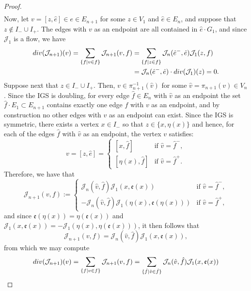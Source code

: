 \documentclass[10pt,a4paper]{amsart}
\newcommand{\cJ}{\mathcal{J}}
\newcommand{\divr}{{\rm div}}
\begin{document}
\begin{proof}
\[\begin{split}
        \end{split}
        \]
    Now, let \(v=[z,\hat{e}]\in e\in E_{n+1}\) for some \(z\in V_1\) and \(\hat{e}\in E_n\), and suppose that \(z\not\in I_-\cup I_+\). The edges with \(v\) as an endpoint are all contained in \(\hat{e}\cdot G_1\), and since \(\cJ_1\) is a flow, we have
        \[
        \begin{split}
            \divr(\cJ_{n+1})(v)=\sum_{\{f\mid v\in f\}}\cJ_{n+1}(v,f)&=\sum_{\{f\mid z\in f\}}\cJ_n(\hat{e}^-,\hat{e})\cJ_1(z,f)\\
            &=\cJ_n(\hat{e}^-,\hat{e})\cdot\divr(\cJ_1)(z) =0.
        \end{split}
        \]
    Suppose next that \(z\in I_-\cup I_+\). Then, \(v\in\pi_{n+1}^{-1}(\hat{v})\) for some \(\hat{v}=\pi_{n+1}(v)\in V_n\). Since the IGS is doubling, for every edge \(\hat{f}\in E_n\) with \(\hat{v}\) as an endpoint the set \(\hat{f}\cdot E_1\subset E_{n+1}\) contains exactly one edge \(f\) with \(v\) as an endpoint, and by construction no other edges with \(v\) as an endpoint can exist. Since the IGS is symmetric, there exists a vertex \(x\in I_-\) so that \(z\in\{x,\eta(x)\}\) and hence, for each of the edges \(\hat{f}\) with \(\hat{v}\) as an endpoint, the vertex \(v\) satisfies:
    \[
        v=[z,\hat{e}]=
        \begin{cases}
            [x,\hat{f}]&\text{if }\hat{v}=\hat{f}^-,\\
            [\eta(x),\hat{f}]&\text{if }\hat{v}=\hat{f}^+.
        \end{cases}
    \]
    Therefore, we have that
    \[
        \cJ_{n+1}(v,f):=
        \begin{cases}
            \cJ_n(\hat{v},\hat{f})\cJ_1(x,\mathfrak{e}(x))  &\text{if }\hat{v}=\hat{f}^-,\\
            -\cJ_n(\hat{v},\hat{f})\cJ_1(\eta(x),\mathfrak{e}(\eta(x))) &\text{if }\hat{v}=\hat{f}^+,
        \end{cases}
    \]
    and since \(\mathfrak{e}(\eta(x))=\eta(\mathfrak{e}(x))\) and \(\cJ_1(x,\mathfrak{e}(x))=-\cJ_1(\eta(x),\eta(\mathfrak{e}(x)))\), it then follows that
    \[
        \cJ_{n+1}(v,f)=\cJ_n(\hat{v},\hat{f})\cJ_1(x,\mathfrak{e}(x)),
    \]
    from which we may compute
    \begin{equation}\label{Equation: Divergence Lift}
    \begin{split}
        \divr(\cJ_{n+1})(v)=\sum_{\{f\mid v\in f\}}\cJ_{n+1}(v,f)&=\sum_{\{\hat{f}\mid \hat{v}\in\hat{f}\}}\cJ_n(\hat{v},\hat{f}) \cJ_1(x,\mathfrak{e}(x))\\

\end{split}
\end{equation}
\end{proof}
\end{document}
